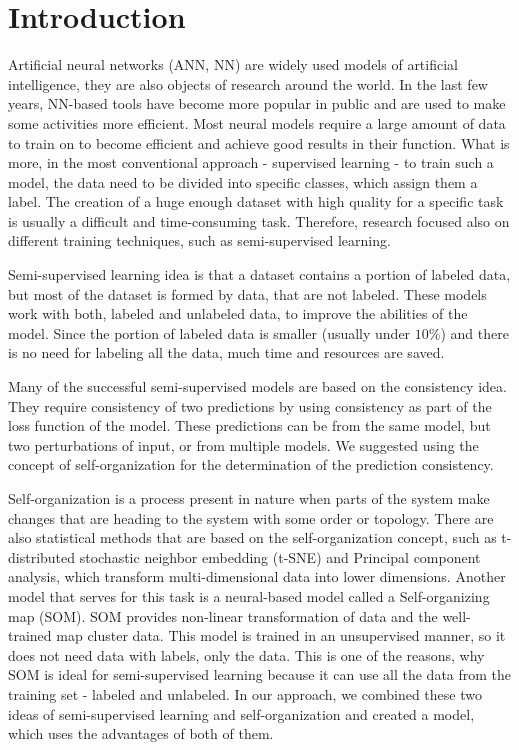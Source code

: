 \chapter*{Introduction} %


Artificial neural networks (ANN, NN) are widely used models of artificial intelligence, they are also objects of research around the world. In the last few years, NN-based tools have become more popular in public and are used to make some activities more efficient. Most neural models require a large amount of data to train on to become efficient and achieve good results in their function. What is more, in the most conventional approach - supervised learning - to train such a model, the data need to be divided into specific classes, which assign them a label. The creation of a huge enough dataset with high quality for a specific task is usually a difficult and time-consuming task. Therefore, research focused also on different training techniques, such as semi-supervised learning. 

Semi-supervised learning idea is that a dataset contains a portion of labeled data, but most of the dataset is formed by data, that are not labeled. These models work with both, labeled and unlabeled data, to improve the abilities of the model. Since the portion of labeled data is smaller (usually under $10\%$) and there is no need for labeling all the data, much time and resources are saved.

Many of the successful semi-supervised models are based on the consistency idea. They require consistency of two predictions by using consistency as part of the loss function of the model. These predictions can be from the same model, but two perturbations of input, or from multiple models. We suggested using the concept of self-organization for the determination of the prediction consistency.

Self-organization is a process present in nature when parts of the system make changes that are heading to the system with some order or topology. There are also statistical methods that are based on the self-organization concept, such as t-distributed stochastic neighbor embedding (t-SNE) and Principal component analysis, which transform multi-dimensional data into lower dimensions. Another model that serves for this task is a neural-based model called a Self-organizing map (SOM). SOM provides non-linear transformation of data and the well-trained map cluster data. This model is trained in an unsupervised manner, so it does not need data with labels, only the data. This is one of the reasons, why SOM is ideal for semi-supervised learning because it can use all the data from the training set - labeled and unlabeled. In our approach, we combined these two ideas of semi-supervised learning and self-organization and created a model, which uses the advantages of both of them.


